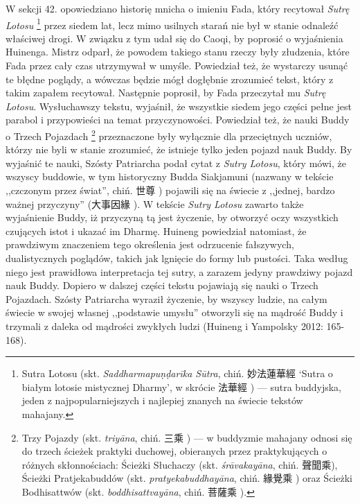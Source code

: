 W sekcji 42. opowiedziano historię mnicha o imieniu Fada, który recytował \textit{Sutrę Lotosu}%
\footnote{Sutra Lotosu (skt. \textit{Saddharmapu\d{n}\d{d}arīka Sūtra}, chiń. 妙法蓮華經  `Sutra o białym lotosie mistycznej Dharmy', w skrócie 法華經 ) --- sutra buddyjska, jeden z najpopularniejszych i najlepiej znanych na świecie tekstów mahajany.} przez siedem lat,
lecz mimo usilnych starań nie był w stanie odnaleźć właściwej drogi.
W związku z tym udał się do Caoqi, by poprosić o wyjaśnienia  Huinenga.
Mistrz odparł, że powodem takiego stanu rzeczy były złudzenia, które Fada przez cały czas utrzymywał w umyśle.
Powiedział też, że wystarczy usunąć te błędne poglądy, a wówczas będzie mógł dogłębnie zrozumieć tekst, który z takim zapałem recytował.
Następnie poprosił, by Fada przeczytał mu \textit{Sutrę Lotosu}.
Wysłuchawszy tekstu, wyjaśnił, że wszystkie siedem jego części pełne jest parabol i przypowieści na temat przyczynowości.
Powiedział też, że nauki Buddy o Trzech Pojazdach%
\footnote{Trzy Pojazdy\label{Triyana} (skt. \textit{triyāna}, chiń. 三乘 ) --- w buddyzmie mahajany odnosi się do trzech ścieżek praktyki duchowej, obieranych przez praktykujących o różnych skłonnościach: Ścieżki Słuchaczy (skt. \textit{śrāvakayāna}, chiń. 聲聞乘), Ścieżki Pratjekabuddów (skt. \textit{pratyekabuddhayāna}, chiń. 緣覺乘 ) oraz Ścieżki Bodhisattwów (skt. \textit{boddhisattvayāna}, chiń. 菩薩乘 ).}
przeznaczone były wyłącznie dla przeciętnych uczniów, którzy nie byli w stanie zrozumieć, że istnieje tylko jeden pojazd nauk Buddy.
By wyjaśnić te nauki, Szósty Patriarcha podał cytat z \textit{Sutry Lotosu}, który mówi, że wszyscy buddowie, w tym historyczny Budda Siakjamuni (nazwany w tekście ,,czczonym przez świat'', chiń. 世尊 ) pojawili się na świecie z ,,jednej, bardzo ważnej przyczyny'' (大事因緣 ).
W tekście \textit{Sutry Lotosu} zawarto także wyjaśnienie Buddy, iż przyczyną tą jest życzenie, by otworzyć oczy wszystkich czujących istot i ukazać im Dharmę.
Huineng powiedział natomiast, że prawdziwym znaczeniem tego określenia jest odrzucenie fałszywych, dualistycznych poglądów, takich jak lgnięcie do formy lub pustości.
Taka według niego jest prawidłowa interpretacja tej sutry, a zarazem jedyny prawdziwy pojazd nauk Buddy.
Dopiero w dalszej części tekstu pojawiają się nauki o Trzech Pojazdach.
Szósty Patriarcha wyraził życzenie, by wszyscy ludzie, na całym świecie w swojej własnej ,,podstawie umysłu''  otworzyli się na mądrość Buddy i trzymali z daleka od mądrości zwykłych ludzi %
(Huineng i Yampolsky 2012: 165-168).

